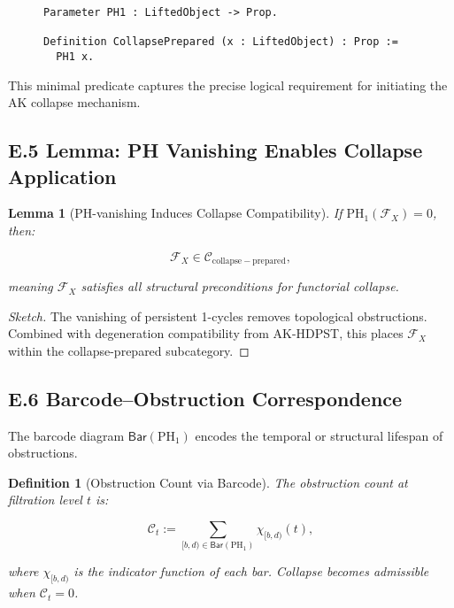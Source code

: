 \documentclass[11pt]{article}
\newtheorem{definition}[theorem]{Definition}
\newtheorem{lemma}[theorem]{Lemma}
\begin{document}
\begin{figure}[h]
\centering
\begin{lstlisting}[language=Coq, caption=Persistent Homology Based Collapse Preparedness]
Parameter PH1 : LiftedObject -> Prop.

Definition CollapsePrepared (x : LiftedObject) : Prop :=
  PH1 x.
\end{lstlisting}
\end{figure}

This minimal predicate captures the precise logical requirement for initiating the AK collapse mechanism.

\subsection*{E.5 Lemma: PH Vanishing Enables Collapse Application}

\begin{lemma}[PH-vanishing Induces Collapse Compatibility]
If \( \mathrm{PH}_1(\mathcal{F}_X) = 0 \), then:

\[
\mathcal{F}_X \in \mathcal{C}_{\mathrm{collapse-prepared}},
\]

meaning \( \mathcal{F}_X \) satisfies all structural preconditions for functorial collapse.
\end{lemma}

\begin{proof}[Sketch]
The vanishing of persistent 1-cycles removes topological obstructions. Combined with degeneration compatibility from AK-HDPST, this places \( \mathcal{F}_X \) within the collapse-prepared subcategory.
\end{proof}

\subsection*{E.6 Barcode–Obstruction Correspondence}

The barcode diagram \( \mathsf{Bar}(\mathrm{PH}_1) \) encodes the temporal or structural lifespan of obstructions.

\begin{definition}[Obstruction Count via Barcode]
The obstruction count at filtration level \( t \) is:

\[
\mathcal{C}_t := \sum_{[b,d) \in \mathsf{Bar}(\mathrm{PH}_1)} \chi_{[b,d)}(t),
\]

where \( \chi_{[b,d)} \) is the indicator function of each bar. Collapse becomes admissible when \( \mathcal{C}_t = 0 \).
\end{definition}
\end{document}
